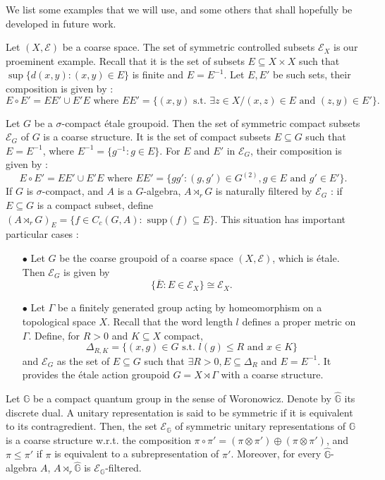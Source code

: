 We list some examples that we will use, and some others that shall hopefully be developed in future work.

\begin{Expl}
Let $(X,\mathcal E)$ be a coarse space. The set of symmetric controlled subsets $\mathcal E_X$ is our proeminent example. Recall that it is the set of subsets $E\subseteq X\times X$ such that $\sup \{ d(x,y) : (x,y)\in E\}$ is finite and $E=E^{-1}$. Let $E,E'$ be such sets, their composition is given by :
\[E\circ E' = EE' \cup E'E \text{ where }EE' = \{(x,y) \text{ s.t. }\exists z\in X / (x,z)\in E \text{ and }(z,y)\in E'\}.\]
\end{Expl}

\begin{Expl}
Let $G$ be a $\sigma$-compact étale groupoid. Then the set of symmetric compact subsets $\mathcal E_G$ of $G$ is a coarse structure. It is the set of compact subsets $E\subseteq G$ such that $E=E^{-1}$, where $E^{-1} = \{g^{-1} : g\in E\}$. For $E$ and $E'$ in $\mathcal E_G$, their composition is given by :
\[E\circ E' = EE' \cup E'E \text{ where }EE' = \{gg' : (g,g')\in G^{(2)}, g\in E\text{ and } g'\in E'\}.\] 
If $G$ is $\sigma$-compact, and $A$ is a $G$-algebra, $A\rtimes_r G$ is naturally filtered by $\mathcal E_G$ : if $E\subseteq G$ is a compact subset, define $(A\rtimes_r G)_E = \{f\in C_c(G,A) : \text{ supp}(f)\subseteq E\}$. This situation has important particular cases :
\begin{itemize}
\item[$\bullet$] Let $G$ be the coarse groupoid of a coarse space $(X,\mathcal E)$, which is étale. Then $\mathcal E_G$ is given by \[\{\overline{E} : E\in\mathcal E_X\} \cong \mathcal E_X.\] 
\item[$\bullet$] Let $\Gamma$ be a finitely generated group acting by homeomorphism on a topological space $X$. Recall that the word length $l$ defines a proper metric on $\Gamma$. Define, for $R>0$ and $K\subseteq X$ compact, 
\[\Delta_{R,K} = \{(x,g)\in G \text{ s.t. } l(g)\leq R \text{ and } x\in K\}\] 
and $\mathcal E_G $ as the set of $E\subseteq G$ such that $\exists R>0, E\subseteq \Delta_R$ and $E = E^{-1}$. It provides the étale action groupoid $G=X\rtimes \Gamma$ with a coarse structure.
\end{itemize}
\end{Expl}

\begin{Expl}\label{EQG}
Let $\mathbb G$ be a compact quantum group in the sense of Woronowicz. Denote by $\hat{\mathbb G}$ its discrete dual. A unitary representation is said to be symmetric if it is equivalent to its contragredient. Then, the set $\mathcal E_{\mathbb G}$ of symmetric unitary representations of $\mathbb G$ is a coarse structure w.r.t. the composition $\pi\circ \pi'=(\pi\otimes \pi')\oplus (\pi\otimes \pi')$, and $\pi\leq\pi'$ if $\pi$ is equivalent to a subrepresentation of $\pi'$. Moreover, for every $\hat{\mathbb G}$-algebra $A$,  $A\rtimes_r \hat{\mathbb G}$ is $\mathcal E_{\mathbb G}$-filtered.
\end{Expl}

